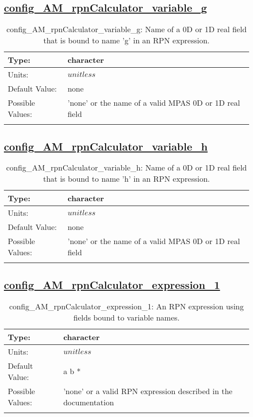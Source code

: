 \subsection[config\_AM\_rpnCalculator\_variable\_g]{\hyperref[sec:nm_tab_AM_rpnCalculator]{config\_AM\_rpnCalculator\_variable\_g}}
\label{subsec:nm_sec_config_AM_rpnCalculator_variable_g}
\begin{center}
\begin{longtable}{| p{2.0in} || p{4.0in} |}
    \hline
    Type: & character \\
    \hline
    Units: & $unitless$ \\
    \hline
    Default Value: & none \\
    \hline
    Possible Values: & 'none' or the name of a valid MPAS 0D or 1D real field \\
    \hline
    \caption{config\_AM\_rpnCalculator\_variable\_g: Name of a 0D or 1D real field that is bound to name 'g' in an RPN expression.}
\end{longtable}
\end{center}
\subsection[config\_AM\_rpnCalculator\_variable\_h]{\hyperref[sec:nm_tab_AM_rpnCalculator]{config\_AM\_rpnCalculator\_variable\_h}}
\label{subsec:nm_sec_config_AM_rpnCalculator_variable_h}
\begin{center}
\begin{longtable}{| p{2.0in} || p{4.0in} |}
    \hline
    Type: & character \\
    \hline
    Units: & $unitless$ \\
    \hline
    Default Value: & none \\
    \hline
    Possible Values: & 'none' or the name of a valid MPAS 0D or 1D real field \\
    \hline
    \caption{config\_AM\_rpnCalculator\_variable\_h: Name of a 0D or 1D real field that is bound to name 'h' in an RPN expression.}
\end{longtable}
\end{center}
\subsection[config\_AM\_rpnCalculator\_expression\_1]{\hyperref[sec:nm_tab_AM_rpnCalculator]{config\_AM\_rpnCalculator\_expression\_1}}
\label{subsec:nm_sec_config_AM_rpnCalculator_expression_1}
\begin{center}
\begin{longtable}{| p{2.0in} || p{4.0in} |}
    \hline
    Type: & character \\
    \hline
    Units: & $unitless$ \\
    \hline
    Default Value: & a b * \\
    \hline
    Possible Values: & 'none' or a valid RPN expression described in the documentation \\
    \hline
    \caption{config\_AM\_rpnCalculator\_expression\_1: An RPN expression using fields bound to variable names.}
\end{longtable}
\end{center}

